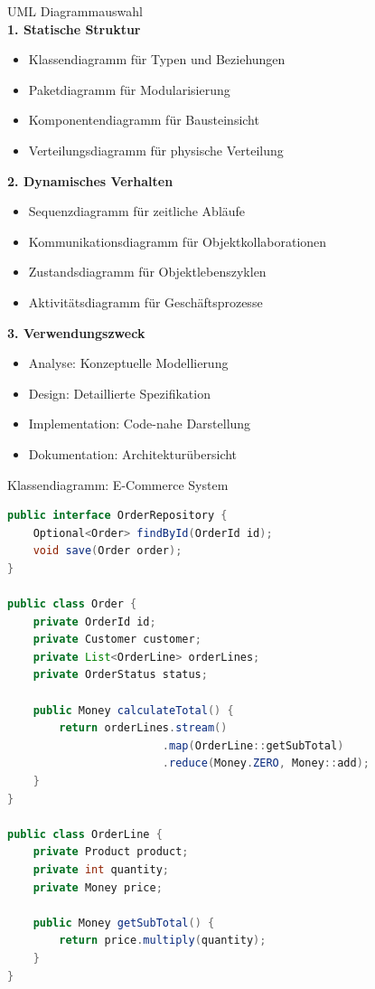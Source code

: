 \begin{KR}{UML Diagrammauswahl}\\
\textbf{1. Statische Struktur}
\begin{itemize}
    \item Klassendiagramm für Typen und Beziehungen
    \item Paketdiagramm für Modularisierung
    \item Komponentendiagramm für Bausteinsicht
    \item Verteilungsdiagramm für physische Verteilung
\end{itemize}

\textbf{2. Dynamisches Verhalten}
\begin{itemize}
    \item Sequenzdiagramm für zeitliche Abläufe
    \item Kommunikationsdiagramm für Objektkollaborationen
    \item Zustandsdiagramm für Objektlebenszyklen
    \item Aktivitätsdiagramm für Geschäftsprozesse
\end{itemize}

\textbf{3. Verwendungszweck}
\begin{itemize}
    \item Analyse: Konzeptuelle Modellierung
    \item Design: Detaillierte Spezifikation
    \item Implementation: Code-nahe Darstellung
    \item Dokumentation: Architekturübersicht
\end{itemize}
\end{KR}

\begin{example2}{Klassendiagramm: E-Commerce System}
\begin{lstlisting}[language=Java, style=basesmol]
public interface OrderRepository {
    Optional<Order> findById(OrderId id);
    void save(Order order);
}

public class Order {
    private OrderId id;
    private Customer customer;
    private List<OrderLine> orderLines;
    private OrderStatus status;
    
    public Money calculateTotal() {
        return orderLines.stream()
                        .map(OrderLine::getSubTotal)
                        .reduce(Money.ZERO, Money::add);
    }
}

public class OrderLine {
    private Product product;
    private int quantity;
    private Money price;
    
    public Money getSubTotal() {
        return price.multiply(quantity);
    }
}
\end{lstlisting}
\end{example2}

